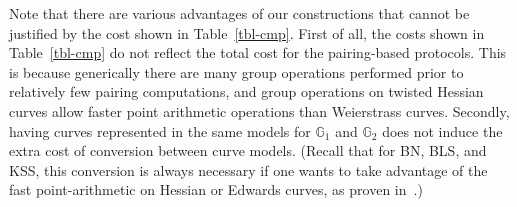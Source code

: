 Note that there are various advantages of our constructions that cannot be justified by the cost shown in Table~\ref{tbl-cmp}.
First of all, the costs shown in Table~\ref{tbl-cmp} do not reflect the total cost for the pairing-based protocols.
This is because generically there are many group operations performed prior to relatively few pairing computations,
and group operations on twisted Hessian curves allow faster point arithmetic operations than Weierstrass curves.
Secondly, having curves represented in the same models for $\mathbb{G}_1$ and $\mathbb{G}_2$ does not induce the extra cost of conversion between curve models.
(Recall that for BN, BLS, and KSS, this conversion is always necessary if one wants to take advantage of
the fast point-arithmetic on Hessian or Edwards curves, as proven in~\cite{2013/bos-pairing}.)


%
%
%



